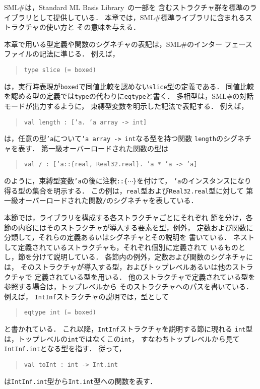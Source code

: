\documentclass{jbook}
\newcommand{\smlsharp}{SML\#}
\begin{document}
{\ifjp%
\else%
\fi%


	\smlsharp{}は，Standard ML Basis Library~\cite{smlbasis}の一部を
含むストラクチャ群を標準のライブラリとして提供している．
	本章では，\smlsharp{}標準ライブラリに含まれるストラクチャの使い方と
その意味を与える．

	本章で用いる型定義や関数のシグネチャの表記は，\smlsharp{}のインター
フェースファイルの記法に準じる．
	例えば，
\begin{quote}
\tt type slice (= boxed)
\end{quote}
は，実行時表現が{\tt boxed}で同値比較を認めない{\tt slice}型の定義である．
	同値比較を認める型の定義では{\tt type}の代わりに{\tt eqtype}と書く．
	多相型は，\smlsharp{}の対話モードが出力するように，
束縛型変数を明示した記法で表記する．
	例えば，
\begin{quote}
\tt val length :~['a.~'a array -> int]
\end{quote}
は，任意の型{\tt 'a}について{\tt 'a array -> int}なる型を持つ関数
{\tt length}のシグネチャを表す．
	第一級オーバーロードされた関数の型は
\begin{quote}
\tt val / :~['a::\{real, Real32.real\}.~'a * 'a -> 'a]
\end{quote}
のように，束縛型変数{\tt 'a}の後に注釈{\tt ::\{$\cdots$\}}を付けて，
{\tt 'a}のインスタンスになり得る型の集合を明示する．
	この例は，{\tt real}型および{\tt Real32.real}型に対して
第一級オーバーロードされた関数{\tt /}のシグネチャを表している．

	本節では，ライブラリを構成する各ストラクチャごとにそれぞれ
節を分け，各節の内容にはそのストラクチャが導入する要素を型，例外，
定数および関数に分類して，それらの定義あるいはシグネチャとその説明を
書いている．
	ネストして定義されているストラクチャも，それぞれ個別に定義されて
いるものとし，節を分けて説明している．
	各節内の例外，定数および関数のシグネチャには，
そのストラクチャが導入する型，およびトップレベルあるいは他のストラクチャで
定義されている型を用いる．
	他のストラクチャで定義されている型を参照する場合は，トップレベルから
そのストラクチャへのパスを書いている．
	例えば，
{\tt IntInf}ストラクチャの説明では，型として
\begin{quote}
\tt eqtype int (= boxed)
\end{quote}
と書かれている．
	これ以降，{\tt IntInf}ストラクチャを説明する節に現れる
{\tt int}型は，トップレベルの{\tt int}ではなくこの{\tt int}，
すなわちトップレベルから見て{\tt IntInf.int}となる型を指す．
	従って，
\begin{quote}
\tt val toInt :~int -> Int.int
\end{quote}
は{\tt IntInf.int}型から{\tt Int.int}型への関数を表す．

}
\end{document}
